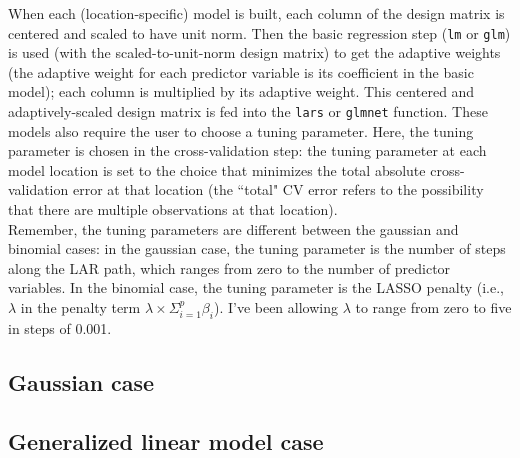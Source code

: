 \documentclass[10pt]{amsart}
\begin{document}
When each (location-specific) model is built, each column of the design matrix is centered and scaled to have unit norm. Then the basic regression step (\verb!lm! or \verb!glm!) is used (with the scaled-to-unit-norm design matrix) to get the adaptive weights (the adaptive weight for each predictor variable is its coefficient in the basic model); each column is multiplied by its adaptive weight. This centered and adaptively-scaled design matrix is fed into the \verb!lars! or \verb!glmnet! function. These models also require the user to choose a tuning parameter. Here, the tuning parameter is chosen in the cross-validation step: the tuning parameter at each model location is set to the choice that minimizes the total absolute cross-validation error at that location (the ``total" CV error refers to the possibility that there are multiple observations at that location).\\

Remember, the tuning parameters are different between the gaussian and binomial cases: in the gaussian case, the tuning parameter is the number of steps along the LAR path, which ranges from zero to the number of predictor variables. In the binomial case, the tuning parameter is the LASSO penalty (i.e., $\lambda$ in the penalty term $\lambda \times \Sigma_{i=1}^p\beta_i$). I've been allowing $\lambda$ to range from zero to five in steps of 0.001.\\

\subsection{Gaussian case}


\subsection{Generalized linear model case}
\end{document}
